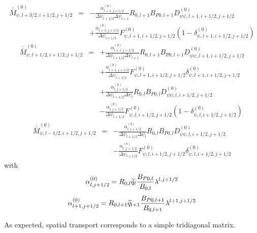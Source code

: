 \begin{eqnarray}
\overline{\overline{M}}_{\psi ,l+3/2,i+1/2,j+1/2}^{\left( 0\right) } &=&-%
\frac{\alpha _{l+1,j+1/2}^{\left( 0\right) }}{\Delta \psi _{l+1/2}\Delta %
\psi _{l+1}}R_{0,l+1}B_{P0,l+1}D_{\psi \psi ,l+1,i+1/2,j+1/2}^{\left(
0\right) }  \nonumber \\
&&+\frac{\alpha _{l+1,j+1/2}^{\left( 0\right) }}{\Delta \psi _{l+1/2}}%
F_{\psi ,l+1,i+1/2,j+1/2}^{\left( 0\right) }\left( 1-\delta _{\psi
,l+1,i+1/2,j+1/2}^{\left( 0\right) }\right)
\end{eqnarray}
\begin{eqnarray}
\overline{\overline{M}}_{\psi ,l+1/2,i+1/2,j+1/2}^{\left( 0\right) } &=&+%
\frac{\alpha _{l+1,j+1/2}^{\left( 0\right) }}{\Delta \psi _{l+1/2}\Delta %
\psi _{l+1}}R_{0,l+1}B_{P0,l+1}D_{\psi \psi ,l+1,i+1/2,j+1/2}^{\left(
0\right) }  \nonumber \\
&&+\frac{\alpha _{l+1,j+1/2}^{\left( 0\right) }}{\Delta \psi _{l+1/2}}%
F_{\psi ,l+1,i+1/2,j+1/2}^{\left( 0\right) }\delta _{\psi
,l+1,i+1/2,j+1/2}^{\left( 0\right) }  \nonumber \\
&&+\frac{\alpha _{l,j+1/2}^{\left( 0\right) }}{\Delta \psi _{l+1/2}\Delta %
\psi _{l}}R_{0,l}B_{P0,l}D_{\psi \psi ,l,i+1/2,j+1/2}^{\left( 0\right) }
\nonumber \\
&&-\frac{\alpha _{l,j+1/2}^{\left( 0\right) }}{\Delta \psi _{l+1/2}}F_{\psi
,l,i+1/2,j+1/2}^{\left( 0\right) }\left( 1-\delta _{\psi
,l,i+1/2,j+1/2}^{\left( 0\right) }\right)
\end{eqnarray}
\begin{eqnarray}
\overline{\overline{M}}_{\psi ,l-1/2,i+1/2,j+1/2}^{\left( 0\right) } &=&-%
\frac{\alpha _{l,j+1/2}^{\left( 0\right) }}{\Delta \psi _{l+1/2}\Delta \psi
_{l}}R_{0,l}B_{P0,l}D_{\psi \psi ,l,i+1/2,j+1/2}^{\left( 0\right) }
\nonumber \\
&&-\frac{\alpha _{l,j+1/2}^{\left( 0\right) }}{\Delta \psi _{l+1/2}}F_{\psi
,l,i+1/2,j+1/2}^{\left( 0\right) }\delta _{\psi ,l,i+1/2,j+1/2}^{\left(
0\right) }
\end{eqnarray}
with
\begin{equation}
\alpha _{l,j+1/2}^{\left( 0\right) }=R_{0,l}\widetilde{q}_{l}\frac{B_{P0,l}}{%
B_{0,l}}\lambda ^{l,j+1/2}
\end{equation}
\begin{equation}
\alpha _{l+1,j+1/2}^{\left( 0\right) }=R_{0,l+1}\widetilde{q}_{l+1}\frac{%
B_{P0,l+1}}{B_{0,l+1}}\lambda ^{l+1,j+1/2}
\end{equation}

As expected, spatial transport corresponds to a simple tridiagonal matrix.
